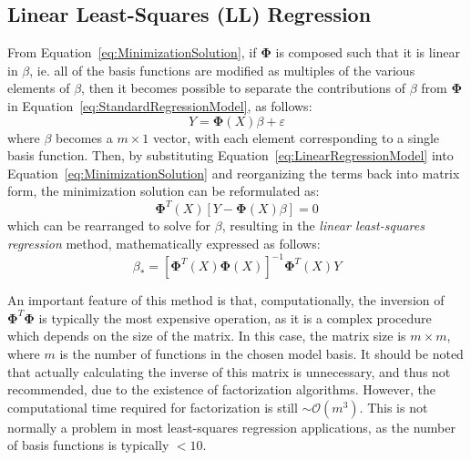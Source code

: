 \documentclass{article}
\begin{document}
\subsection{Linear Least-Squares (LL) Regression}
\label{subsec:LinearLeastSquares}

From Equation~\eqref{eq:MinimizationSolution}, if $\mathbf{\Phi}$ is composed such that it is linear in $\beta$, ie. all of the basis functions are modified as multiples of the various elements of $\beta$, then it becomes possible to separate the contributions of $\beta$ from $\mathbf{\Phi}$ in Equation~\eqref{eq:StandardRegressionModel}, as follows:
\begin{equation}
\label{eq:LinearRegressionModel}
	Y = \mathbf{\Phi}\!\left(X\right) \beta + \varepsilon
\end{equation}
where $\beta$ becomes a $m \times 1$ vector, with each element corresponding to a single basis function. Then, by substituting Equation~\eqref{eq:LinearRegressionModel} into Equation~\eqref{eq:MinimizationSolution} and reorganizing the terms back into matrix form, the minimization solution can be reformulated as:
\begin{equation}
\label{eq:LinearMinimizationSolution}
	\mathbf{\Phi}^T\!\left(X\right) \left[Y - \mathbf{\Phi}\!\left(X\right) \beta\right] = 0
\end{equation}
which can be rearranged to solve for $\beta$, resulting in the \emph{linear least-squares regression} method, mathematically expressed as follows:
\begin{equation}
\label{eq:LinearLeastSquaresRegression}
	\beta_* = \left[\mathbf{\Phi}^T\!\left(X\right) \mathbf{\Phi}\!\left(X\right)\right]^{-1} \mathbf{\Phi}^T\!\left(X\right) Y
\end{equation}

An important feature of this method is that, computationally, the inversion of $\mathbf{\Phi}^T\mathbf{\Phi}$ is typically the most expensive operation, as it is a complex procedure which depends on the size of the matrix. In this case, the matrix size is $m \times m$, where $m$ is the number of functions in the chosen model basis. It should be noted that actually calculating the inverse of this matrix is unnecessary, and thus not recommended, due to the existence of factorization algorithms. However, the computational time required for factorization is still $\sim\mathcal{O}\!\left(m^3\right)$. This is not normally a problem in most least-squares regression applications, as the number of basis functions is typically $<10$.
\end{document}

